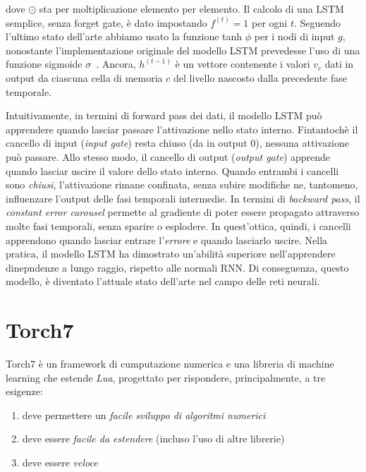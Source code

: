 dove $\odot$ sta per moltiplicazione elemento per elemento.
Il calcolo di una LSTM semplice, senza forget gate, \`e dato impostando
$f^{(t)} = 1$ per ogni $t$. Seguendo l'ultimo stato dell'arte abbiamo usato la
funzione tanh $\phi$ per i nodi di input $g$, nonostante l'implementazione
originale del modello LSTM prevedesse l'uso di una funzione sigmoide $\sigma$~\cite{Hochreiter:1997}.
Ancora, $h^{(t-1)}$ \`e un vettore contenente i valori $v_c$ dati in output da
ciascuna cella di memoria $c$ del livello nascosto dalla precedente fase temporale.

Intuitivamente, in termini di forward pass dei dati, il modello LSTM pu\`o
apprendere quando lasciar passare l'attivazione nello stato interno. Fintantoch\`e
il cancello di input (\emph{input gate}) resta chiuso (da in output 0), nessuna
attivazione pu\`o passare. Allo stesso modo, il cancello di output (\emph{output
gate}) apprende quando lasciar uscire il valore dello stato interno. Quando
entrambi i cancelli sono \emph{chiusi}, l'attivazione rimane confinata, senza
subire modifiche ne, tantomeno, influenzare l'output delle fasi temporali intermedie.
In termini di \emph{backward pass}, il \emph{constant error carousel} permette al
gradiente di poter essere propagato attraverso molte fasi temporali, senza sparire
o esplodere. In quest'ottica, quindi, i cancelli apprendono quando lasciar entrare
l'\emph{errore} e quando lasciarlo uscire. Nella pratica, il modello LSTM ha
dimostrato un'abilit\`a superiore nell'apprendere dinepndenze a lungo raggio,
rispetto alle normali RNN. Di conseguenza, questo modello, \`e diventato
l'attuale stato dell'arte nel campo delle reti neurali.

\section{Torch7}
\label{sec:torch}
\nocite{Collobert:2011}

Torch7 \`e un framework di cumputazione numerica e una libreria di machine learning
che estende \emph{Lua}, progettato per rispondere, principalmente, a tre esigenze:

\begin{enumerate}
  \item deve permettere un \emph{facile sviluppo di algoritmi numerici}
  \item deve essere \emph{facile da estendere} (incluso l'uso di altre librerie)
  \item deve essere \emph{veloce}
\end{enumerate}


